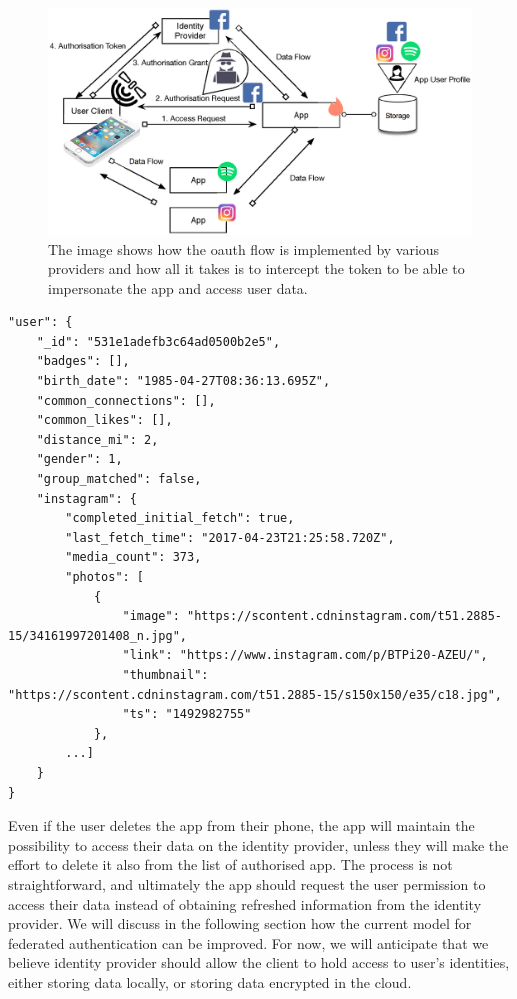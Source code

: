 \begin{figure}
\includegraphics[width=\textwidth]{figures/oauth-weak-points.eps}
\caption[OAuth 2.0 pain points.]{The image shows how the oauth flow is implemented by various providers and how all it takes is to intercept the token to be able to impersonate the app and access user data.
\label{fig:oauth-weak}}
\end{figure}

\begin{lstlisting}
"user": {
    "_id": "531e1adefb3c64ad0500b2e5",
    "badges": [],
    "birth_date": "1985-04-27T08:36:13.695Z",                
    "common_connections": [],
    "common_likes": [],
    "distance_mi": 2,
    "gender": 1,
    "group_matched": false,
    "instagram": {
        "completed_initial_fetch": true,
        "last_fetch_time": "2017-04-23T21:25:58.720Z",
        "media_count": 373,
        "photos": [
            {
                "image": "https://scontent.cdninstagram.com/t51.2885-15/34161997201408_n.jpg",
                "link": "https://www.instagram.com/p/BTPi20-AZEU/",
                "thumbnail": "https://scontent.cdninstagram.com/t51.2885-15/s150x150/e35/c18.jpg",
                "ts": "1492982755"
            },
        ...]
    }
}
\end{lstlisting}

Even if the user deletes the app from their phone, the app will maintain the possibility to access their data on the identity provider, unless they will make the effort to delete it also from the list of authorised app. The process is not straightforward, and ultimately the app should request the user permission to access their data instead of obtaining refreshed information from the identity provider.
We will discuss in the following section how the current model for federated authentication can be improved. For now, we will anticipate that we believe identity provider should allow the client to hold access to user's identities, either storing data locally, or storing data encrypted in the cloud.

